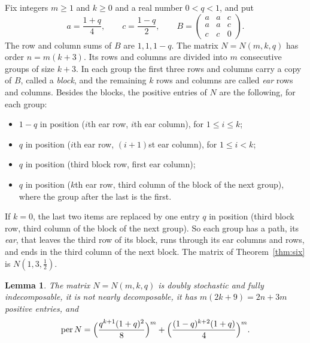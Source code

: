 \documentclass[11pt]{amsart}
\newtheorem{lemma}[theorem]{Lemma}
\theoremstyle{remark}
\DeclareMathOperator{\per}{per}
\newcommand{\half}{\tfrac12}
\begin{document}
Fix integers $m\ge1$ and $k\ge0$ and a real number $0<q<1$, and put
\[
  a=\frac{1+q}{4},\qquad c=\frac{1-q}{2},\qquad
  B=\begin{pmatrix}a&a&c\\a&a&c\\c&c&0\end{pmatrix}.
\]
The row and column sums of $B$ are $1,1,1-q$. The matrix $N=N(m,k,q)$ has
order $n=m(k+3)$. Its rows and columns are divided into $m$ consecutive groups
of size $k+3$. In each group the first three rows and columns carry a copy of
$B$, called a \emph{block}, and the remaining $k$ rows and columns are called
\emph{ear} rows and columns. Besides the blocks, the positive entries of $N$
are the following, for each group:
\begin{itemize}
\item $1-q$ in position ($i$th ear row, $i$th ear column), for $1\le i\le k$;
\item $q$ in position ($i$th ear row, $(i+1)$st ear column), for $1\le i<k$;
\item $q$ in position (third block row, first ear column);
\item $q$ in position ($k$th ear row, third column of the block of the next
group), where the group after the last is the first.
\end{itemize}
If $k=0$, the last two items are replaced by one entry $q$ in position (third
block row, third column of the block of the next group). So each group has a
path, its \emph{ear}, that leaves the third row of its block, runs through its
ear columns and rows, and ends in the third column of the next block. The matrix
of Theorem~\ref{thm:six} is $N(1,3,\half)$.

\begin{lemma}\label{lem:necklace}
The matrix $N=N(m,k,q)$ is doubly stochastic and fully indecomposable, it is
not nearly decomposable, it has $m(2k+9)=2n+3m$ positive entries, and
\begin{equation}\label{eq:per}
  \per N=\Bigl(\frac{q^{k+1}(1+q)^2}{8}\Bigr)^{m}
        +\Bigl(\frac{(1-q)^{k+2}(1+q)}{4}\Bigr)^{m}.
\end{equation}
\end{lemma}
\end{document}
